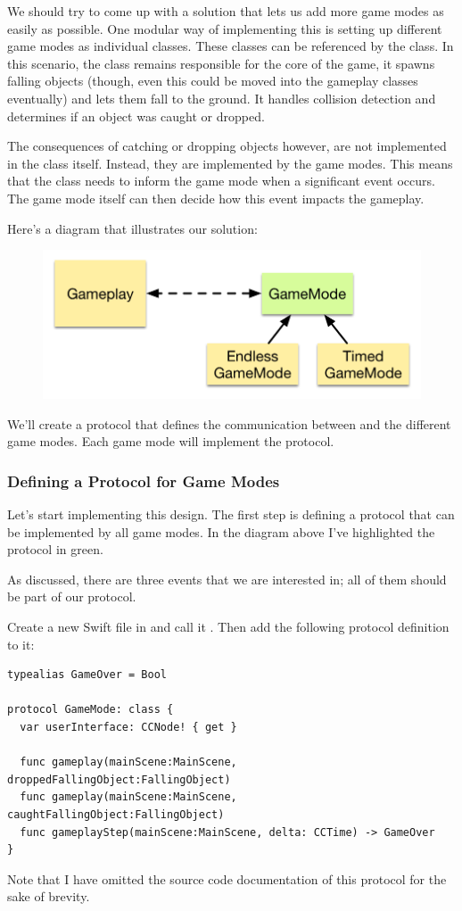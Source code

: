 We should try to come up with a solution that lets us add more game modes as
easily as possible. One modular way of implementing this is setting up different
game modes as individual classes. These classes can be referenced by the
 class. In this scenario, the  class
remains responsible for the core of the game, it spawns falling objects (though,
even this could be moved into the gameplay classes eventually) and lets them
fall to the ground. It handles collision detection and determines if an object
was caught or dropped.

The consequences of catching or dropping objects however, are not implemented in
the  class itself. Instead, they are implemented by the
game modes. This means that the  class needs to inform the
game mode when a significant event occurs. The game mode itself can then decide
how this event impacts the gameplay.

Here's a diagram that illustrates our solution:

\begin{figure}[H]
    \centering
    \includegraphics[width=0.5\linewidth]{images/Chapter7/gameplay_design.png}
\end{figure} 

We'll create a  protocol that defines the
communication between  and the different game modes. Each
game mode will implement the  protocol.

\subsubsection{Defining a Protocol for Game Modes}
Let's start implementing this design. The first step is defining a protocol
that can be implemented by all game modes. In the diagram above I've highlighted
the protocol in green.

As discussed, there are three events that we are interested in; all of them
should be part of our protocol.
\begin{leftbar}
Create a new Swift file in \xcode{} and call it
.
Then add the following protocol definition to it:
\begin{lstlisting}
typealias GameOver = Bool

protocol GameMode: class {
  var userInterface: CCNode! { get }

  func gameplay(mainScene:MainScene, droppedFallingObject:FallingObject)
  func gameplay(mainScene:MainScene, caughtFallingObject:FallingObject)
  func gameplayStep(mainScene:MainScene, delta: CCTime) -> GameOver
}
\end{lstlisting}
\end{leftbar}
Note that I have omitted the source code documentation of this protocol for the
sake of brevity. 

